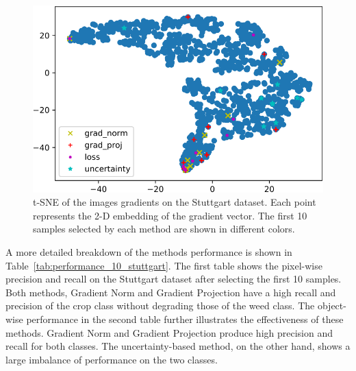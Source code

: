 \documentclass[letterpaper, 10 pt, conference]{ieeeconf}  %
\begin{document}
    
    
 \begin{figure}
    \centering
    \includegraphics[width=0.8\linewidth]{pics/tsne_all-crop.pdf}
   		\caption{t-SNE of the images gradients on the Stuttgart dataset. Each point represents the 2-D embedding of the gradient vector. The first 10 samples selected by each method are shown in different colors.}
		\label{fig:tsne}    		
   \end{figure}
    
A more detailed breakdown of the methods performance is shown in Table~\ref{tab:performance_10_stuttgart}. The first table shows the pixel-wise precision and recall on the Stuttgart dataset after selecting the first 10 samples. Both methods, Gradient Norm and Gradient Projection have a high recall and precision of the crop class without degrading those of the weed class. The object-wise performance in the second table further illustrates the effectiveness of these methods. Gradient Norm and Gradient Projection produce high precision and recall for both classes. The uncertainty-based method, on the other hand, shows a large imbalance of performance on the two classes.
   


\end{document}
